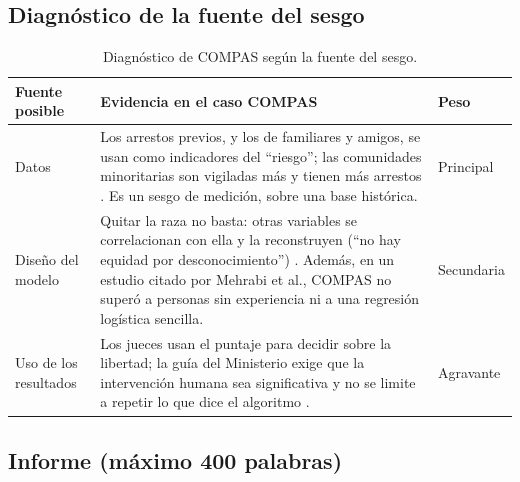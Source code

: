 \documentclass[11pt,letterpaper]{article}
\begin{document}
\subsection{Diagnóstico de la fuente del sesgo}

\begin{table}[H]
\centering
\scriptsize
\renewcommand{\arraystretch}{1.25}
\begin{tabularx}{\textwidth}{@{}p{2.8cm}X p{3cm}@{}}
\toprule
\textbf{Fuente posible} & \textbf{Evidencia en el caso COMPAS} & \textbf{Peso} \\
\midrule
Datos & Los arrestos previos, y los de familiares y amigos, se usan como indicadores del ``riesgo''; las comunidades minoritarias son vigiladas más y tienen más arrestos \parencite{mehrabi2021}. Es un sesgo de medición, sobre una base histórica. & Principal \\
Diseño del modelo & Quitar la raza no basta: otras variables se correlacionan con ella y la reconstruyen (``no hay equidad por desconocimiento'') \parencite{barocas2023}. Además, en un estudio citado por Mehrabi et al., COMPAS no superó a personas sin experiencia ni a una regresión logística sencilla. & Secundaria \\
Uso de los resultados & Los jueces usan el puntaje para decidir sobre la libertad; la guía del Ministerio exige que la intervención humana sea significativa y no se limite a repetir lo que dice el algoritmo \parencite{mites2022}. & Agravante \\
\bottomrule
\end{tabularx}
\caption{Diagnóstico de COMPAS según la fuente del sesgo.}\label{tab:diagnostico}
\end{table}

\subsection{Informe (máximo 400 palabras)}
\end{document}
